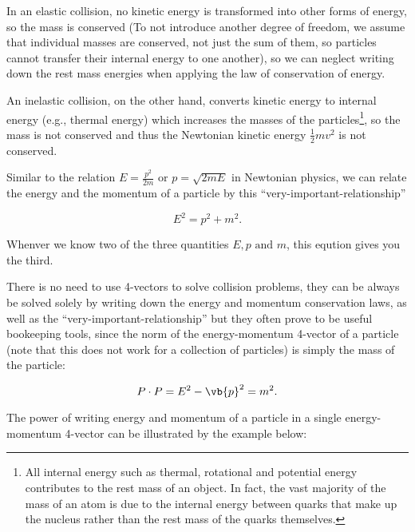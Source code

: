 \documentclass[english,a4paper,12pt]{report}
\begin{document}
In an elastic collision, no kinetic energy is transformed into other forms of energy, so the mass is conserved (To not introduce another degree of freedom, we assume that individual masses are conserved, not just the sum of them, so particles cannot transfer their internal energy to one another), so we can neglect writing down the rest mass energies when applying the law of conservation of energy.

An inelastic collision, on the other hand, converts kinetic energy to internal energy (e.g., thermal energy) which increases the masses of the particles\footnote{All internal energy such as thermal, rotational and potential energy contributes to the rest mass of an object. In fact, the vast majority of the mass of an atom is due to the internal energy between quarks that make up the nucleus rather than the rest mass of the quarks themselves.}, so the mass is not conserved and thus the Newtonian kinetic energy \(\frac{1}{2}mv^2\) is not conserved. 

Similar to the relation \(E = \frac{p^2}{2m} \text { or } p = \sqrt{2mE}  \) in Newtonian physics, we can relate the energy and the momentum of a particle by this ``very-important-relationship''

\begin{equation}\label{veryimportantrelationship} 
    E^2 = p^2 + m^2.
\end{equation}

Whenver we know two of the three quantities \(E,p \text { and }  m\), this eqution gives you the third.

There is no need to use 4-vectors to solve collision problems, they can be always be solved solely by writing down the energy and momentum conservation laws, as well as the ``very-important-relationship'' but they often prove to be useful bookeeping tools, since the norm of the energy-momentum 4-vector of a particle (note that this does not work for a collection of particles) is simply the mass of the particle: 

\begin{equation}
    P \cdot P = E^2 - \vb{p} ^2 = m^2.
\end{equation}

The power of writing energy and momentum of a particle in a single energy-momentum 4-vector can be illustrated by the example below:
\end{document}
